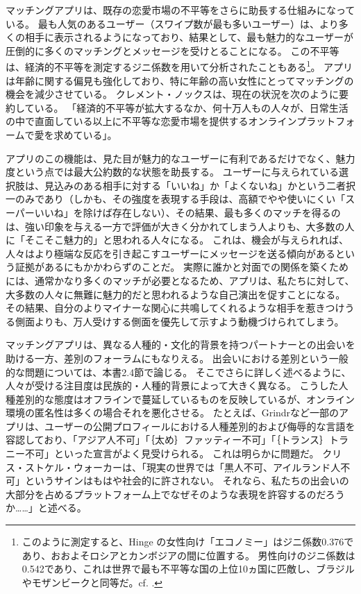 \documentclass[paper=a4,book,openany]{jlreq}
\begin{document}
マッチングアプリは、既存の恋愛市場の不平等をさらに助長する仕組みになっている。
最も人気のあるユーザー（スワイプ数が最も多いユーザー）は、より多くの相手に表示されるようになっており、結果として、最も魅力的なユーザーが圧倒的に多くのマッチングとメッセージを受けとることになる\citep{carr16:_i_foun_out}。
この不平等は、経済的不平等を測定するジニ係数を用いて分析されたこともある\footnote{このように測定すると、Hinge の女性向け「エコノミー」はジニ係数0.376であり、おおよそロシアとカンボジアの間に位置する。
男性向けのジニ係数は0.542であり、これは世界で最も不平等な国の上位10ヵ国に匹敵し、ブラジルやモザンビークと同等だ。cf. \citet{kopf17:_these_statis_show_why_its}.}。
アプリは年齢に関する偏見も強化しており、特に年齢の高い女性にとってマッチングの機会を減少させている\citep{schrobsdorff21:_paulin_poriz}。
クレメント・ノックスは、現在の状況を次のように要約している。
「経済的不平等が拡大するなか、何十万人もの人々が、日常生活の中で直面している以上に不平等な恋愛市場を提供するオンラインプラットフォームで愛を求めている」\citep[p.408]{clement20:_seduc}。

アプリのこの機能は、見た目が魅力的なユーザーに有利であるだけでなく、魅力度という点では最大公約数的な状態を助長する。
ユーザーに与えられている選択肢は、見込みのある相手に対する「いいね」か「よくないね」かという二者択一のみであり（しかも、その強度を表現する手段は、高額でやや使いにくい「スーパーいいね」を除けば存在しない）、その結果、最も多くのマッチを得るのは、強い印象を与える一方で評価が大きく分かれてしまう人よりも、大多数の人に「そこそこ魅力的」と思われる人々になる。
これは、機会が与えられれば、人々はより極端な反応を引き起こすユーザーにメッセージを送る傾向があるという証拠があるにもかかわらずのことだ\citep{rudder11:_mathem_beaut}。
実際に誰かと対面での関係を築くためには、通常かなり多くのマッチが必要となるため、アプリは、私たちに対して、大多数の人々に無難に魅力的だと思われるような自己演出を促すことになる。
その結果、自分のよりマイナーな関心に共鳴してくれるような相手を惹きつけうる側面よりも、万人受けする側面を優先して示すよう動機づけられてしまう。

マッチングアプリは、異なる人種的・文化的背景を持つパートナーとの出会いを助ける一方、差別のフォーラムにもなりえる。
出会いにおける差別という一般的な問題については、本書2.4節で論じる。
そこでさらに詳しく述べるように、人々が受ける注目度は民族的・人種的背景によって大きく異なる。
こうした人種差別的な態度はオフラインで蔓延しているものを反映しているが、オンライン環境の匿名性は多くの場合それを悪化させる。
たとえば、Grindrなど一部のアプリは、ユーザーの公開プロフィールにおける人種差別的および侮辱的な言語を容認しており、「アジア人不可」「｛太め｝{ファッティー}不可」「｛トランス｝{トラニー}不可」といった宣言がよく見受けられる。
これは明らかに問題だ。
クリス・ストケル・ウォーカーは、「現実の世界では「黒人不可、アイルランド人不可」というサインはもはや社会的に許されない。
それなら、私たちの出会いの大部分を占めるプラットフォーム上でなぜそのような表現を許容するのだろうか……」と述べる\citep{stokel-walker18:_why_is_it_ok_onlin}。
\end{document}
